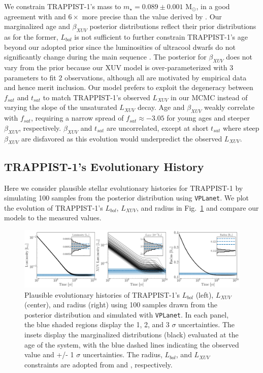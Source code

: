 \documentclass[twocolumn]{aastex62}
\newcommand{\vplanet}[0]{\texttt{VPLanet}\xspace}
\begin{document}
We constrain TRAPPIST-1's mass to $m_{\star} = 0.089 \pm{0.001}$ M$_{\odot}$, in a good agreement with and $6\times$ more precise than the value derived by \citet{vanGrootel2018}. Our marginalized age and $\beta_{XUV}$ posterior distributions reflect their prior distributions as for the former, $L_{bol}$ is not sufficient to further constrain TRAPPIST-1's age beyond our adopted prior since the luminosities of ultracool dwarfs do not significantly change during the main sequence \citep{Baraffe2015}. The posterior for $\beta_{XUV}$ does not vary from the prior because our XUV model is over-parameterized with 3 parameters to fit 2 observations, although all are motivated by empirical data and hence merit inclusion. Our model prefers to exploit the degeneracy between $f_{sat}$ and $t_{sat}$ to match TRAPPIST-1's observed $L_{XUV}$ in our MCMC instead of varying the slope of the unsaturated $L_{XUV}$ decay. Age and $\beta_{XUV}$ weakly correlate with $f_{sat}$, requiring a narrow spread of $f_{sat} \approx -3.05$ for young ages and steeper $\beta_{XUV}$, respectively. $\beta_{XUV}$ and $t_{sat}$ are uncorrelated, except at short $t_{sat}$ where steep $\beta_{XUV}$ are disfavored as this evolution would underpredict the observed $L_{XUV}$.

\subsection{TRAPPIST-1's Evolutionary History}

Here we consider plausible stellar evolutionary histories for TRAPPIST-1 by simulating 100 samples from the posterior distribution using \vplanet. We plot the evolution of TRAPPIST-1's $L_{bol}$, $L_{XUV}$, and radius in Fig.~\ref{fig:evol} and compare our models to the measured values. 

\begin{figure}[t]
	\includegraphics[width=\textwidth]{../Analysis/Evol/trappist1Evol.pdf}
   \caption{Plausible evolutionary histories of TRAPPIST-1's $L_{bol}$ (left), $L_{XUV}$ (center), and radius (right) using 100 samples drawn from the posterior distribution and simulated with \vplanet. In each panel, the blue shaded regions display the 1, 2, and 3 $\sigma$ uncertainties. The insets display the marginalized distributions (black) evaluated at the age of the system, with the blue dashed lines indicating the observed value and +/- 1 $\sigma$ uncertainties. The radius, $L_{bol}$, and $L_{XUV}$ constraints are adopted from \citet{vanGrootel2018} and \citet{Wheatley2017}, respectively.}%
    \label{fig:evol}%
\end{figure}
\end{document}
